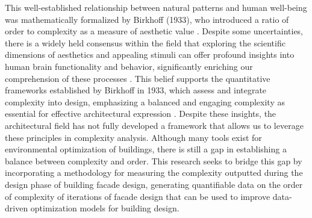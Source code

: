 This well-established relationship between natural patterns and human well-being was mathematically formalized by Birkhoff (1933), who introduced a ratio of order to complexity as a measure of aesthetic value \cite{Birkhoff1933}.
Despite some uncertainties, there is a widely held consensus within the field that exploring the scientific dimensions of aesthetics and appealing stimuli can offer profound insights into human brain functionality and behavior, significantly enriching our comprehension of these processes \cite{Redies2015}.
This belief supports the quantitative frameworks established by Birkhoff in 1933, which assess and integrate complexity into design, emphasizing a balanced and engaging complexity as essential for effective architectural expression \cite{Birkhoff1933}.
Despite these insights, the architectural field has not fully developed a framework that allows us to leverage these principles in complexity analysis.
Although many tools exist for environmental optimization of buildings, there is still a gap in establishing a balance between complexity and order.
This research seeks to bridge this gap by incorporating a methodology for measuring the complexity outputted during the design phase of building facade design, generating quantifiable data on the order of complexity of iterations of facade design that can be used to improve data-driven optimization models for building design.